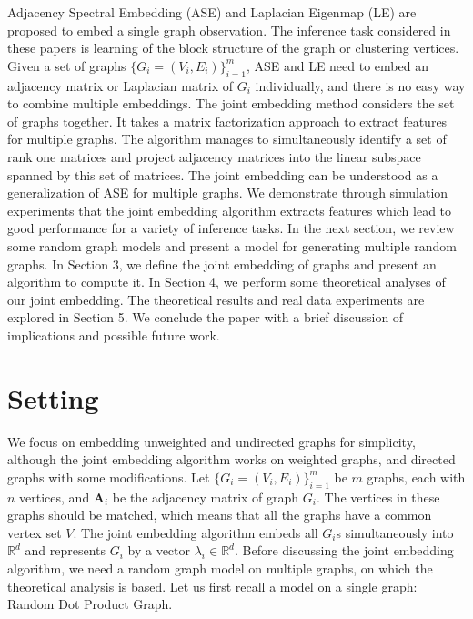 \documentclass[10pt,journal,compsoc]{IEEEtran}
\newcommand{\bA}{\mathbf{A}}
\begin{document}
\noindent Adjacency Spectral Embedding (ASE) and Laplacian Eigenmap (LE) are proposed to embed a single graph observation\cite{sussman2012consistent, belkin2003laplacian}. The inference task considered in these papers is learning of the block structure of the graph or clustering vertices. Given a set of graphs $\{G_i=(V_i,E_i)\} _{i=1}^{m}$, ASE and LE need to embed an adjacency matrix or Laplacian matrix of $G_i$ individually, and there is no easy way to combine multiple embeddings. The joint embedding method considers the set of graphs together. It takes a matrix factorization approach to extract features for multiple graphs. The algorithm manages to simultaneously identify a set of rank one matrices and project adjacency matrices into the linear subspace spanned by this set of matrices. The joint embedding can be understood as a generalization of ASE for multiple graphs. We demonstrate through simulation experiments that the joint embedding algorithm extracts features which lead to good performance for a variety of inference tasks. In the next section, we review some random graph models and present a model for generating multiple random graphs. In Section 3, we define the joint embedding of graphs and present an algorithm to compute it. In Section 4, we perform some theoretical analyses of our joint embedding. The theoretical results and real data experiments are explored in Section 5. We conclude the paper with a brief discussion of implications and possible future work.

\section{Setting}
We focus on embedding unweighted and undirected graphs for simplicity, although the joint embedding algorithm works on weighted graphs, and directed graphs with some modifications.  Let $\{G_i=(V_i,E_i)\} _{i=1}^{m}$ be $m$ graphs, each with $n$ vertices, and $\bA _i$ be the adjacency matrix of graph $G_i$. The vertices in these graphs should be matched, which means that all the graphs have a common vertex set $V$. The joint embedding algorithm embeds all $G_i$s simultaneously into $\mathbb{R}^d$ and represents $G_i$  by a vector $\lambda_i \in \mathbb{R}^d$. Before discussing the joint embedding algorithm, we need a random graph model on multiple graphs, on which the theoretical analysis is based. Let us first recall a model on a single graph: Random Dot Product Graph\cite{young2007random}. 
\end{document}
